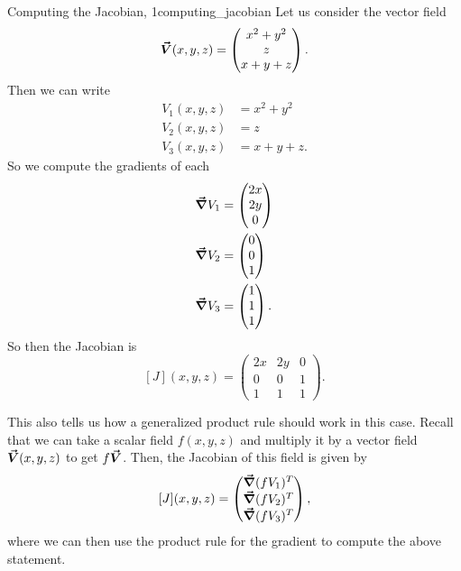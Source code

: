 		        
		        \begin{ex}{Computing the Jacobian, 1}{computing_jacobian}
		        Let us consider the vector field
		        \[
		        \boldsymbol{\vec{V}}(x,y,z) = \begin{pmatrix} x^2+y^2 \\ z \\x+y+z\end{pmatrix}.
		        \]
		        Then we can write
		        \begin{align*}
		            V_1(x,y,z)&= x^2+y^2\\
		            V_2(x,y,z)&= z\\
		            V_3(x,y,z)&= x+y+z.
		        \end{align*}
		        So we compute the gradients of each
		        \begin{align*}
		            \boldsymbol{\vec{\nabla}} V_1 &= \begin{pmatrix} 2x \\ 2y \\ 0 \end{pmatrix}\\
		            \boldsymbol{\vec{\nabla}} V_2 &= \begin{pmatrix} 0 \\ 0 \\ 1 \end{pmatrix}\\
		            \boldsymbol{\vec{\nabla}} V_3 &= \begin{pmatrix} 1 \\ 1 \\ 1 \end{pmatrix}.
		        \end{align*}
		        So then the Jacobian is
		        \[
		        [J](x,y,z) = \begin{pmatrix} 2x & 2y & 0 \\ 0 & 0 & 1\\ 1 & 1 & 1 \end{pmatrix}.
		        \]
		        \end{ex}
		        
		        		       	This also tells us how a generalized product rule should work in this case.  Recall that we can take a scalar field $f(x,y,z)$ and multiply it by a vector field $\boldsymbol{\vec{V}}(x,y,z)$ to get $f\boldsymbol{\vec{V}}$.  Then, the Jacobian of this field is given by
		        		       	\[
		        		       	[J](x,y,z) = \begin{pmatrix} \boldsymbol{\vec{\nabla}} (fV_1)^T \\ \boldsymbol{\vec{\nabla}}(fV_2)^T \\ \boldsymbol{\vec{\nabla}}(fV_3)^T\end{pmatrix},
		        		       	\]
		        		       	where we can then use the product rule for the gradient to compute the above statement.
		        		       	
